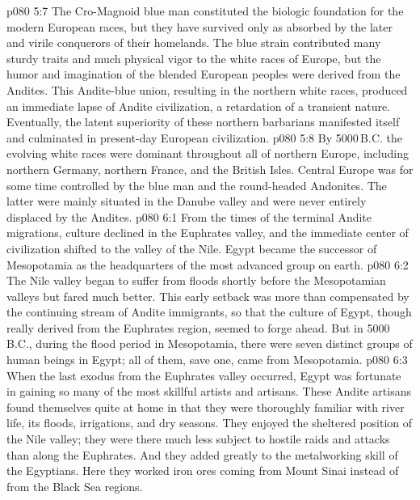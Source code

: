 \vs p080 5:7 \pc The Cro\hyp{}Magnoid blue man constituted the biologic foundation for the modern European races, but they have survived only as absorbed by the later and virile conquerors of their homelands. The blue strain contributed many sturdy traits and much physical vigor to the white races of Europe, but the humor and imagination of the blended European peoples were derived from the Andites. This Andite\hyp{}blue union, resulting in the northern white races, produced an immediate lapse of Andite civilization, a retardation of a transient nature. Eventually, the latent superiority of these northern barbarians manifested itself and culminated in present\hyp{}day European civilization.
\vs p080 5:8 \pc By 5000\,B.C. the evolving white races were dominant throughout all of northern Europe, including northern Germany, northern France, and the British Isles. Central Europe was for some time controlled by the blue man and the round\hyp{}headed Andonites. The latter were mainly situated in the Danube valley and were never entirely displaced by the Andites.
\vs p080 6:1 From the times of the terminal Andite migrations, culture declined in the Euphrates valley, and the immediate center of civilization shifted to the valley of the Nile. Egypt became the successor of Mesopotamia as the headquarters of the most advanced group on earth.
\vs p080 6:2 The Nile valley began to suffer from floods shortly before the Mesopotamian valleys but fared much better. This early setback was more than compensated by the continuing stream of Andite immigrants, so that the culture of Egypt, though really derived from the Euphrates region, seemed to forge ahead. But in 5000\,B.C., during the flood period in Mesopotamia, there were seven distinct groups of human beings in Egypt; all of them, save one, came from Mesopotamia.
\vs p080 6:3 \pc When the last exodus from the Euphrates valley occurred, Egypt was fortunate in gaining so many of the most skillful artists and artisans. These Andite artisans found themselves quite at home in that they were thoroughly familiar with river life, its floods, irrigations, and dry seasons. They enjoyed the sheltered position of the Nile valley; they were there much less subject to hostile raids and attacks than along the Euphrates. And they added greatly to the metalworking skill of the Egyptians. Here they worked iron ores coming from Mount Sinai instead of from the Black Sea regions.
